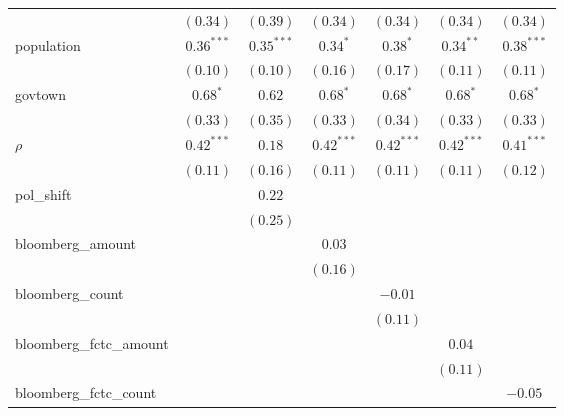 \begin{table}[!h]
\begin{center}
\begin{tabular}{l c c c c c c }
                        & $(0.34)$      & $(0.39)$      & $(0.34)$      & $(0.34)$      & $(0.34)$      & $(0.34)$      \\
population              & $0.36^{***}$  & $0.35^{***}$  & $0.34^{*}$    & $0.38^{*}$    & $0.34^{**}$   & $0.38^{***}$  \\
                        & $(0.10)$      & $(0.10)$      & $(0.16)$      & $(0.17)$      & $(0.11)$      & $(0.11)$      \\
govtown                 & $0.68^{*}$    & $0.62$        & $0.68^{*}$    & $0.68^{*}$    & $0.68^{*}$    & $0.68^{*}$    \\
                        & $(0.33)$      & $(0.35)$      & $(0.33)$      & $(0.34)$      & $(0.33)$      & $(0.33)$      \\
$\rho$                  & $0.42^{***}$  & $0.18$        & $0.42^{***}$  & $0.42^{***}$  & $0.42^{***}$  & $0.41^{***}$  \\
                        & $(0.11)$      & $(0.16)$      & $(0.11)$      & $(0.11)$      & $(0.11)$      & $(0.12)$      \\
pol\_shift              &               & $0.22$        &               &               &               &               \\
                        &               & $(0.25)$      &               &               &               &               \\
bloomberg\_amount       &               &               & $0.03$        &               &               &               \\
                        &               &               & $(0.16)$      &               &               &               \\
bloomberg\_count        &               &               &               & $-0.01$       &               &               \\
                        &               &               &               & $(0.11)$      &               &               \\
bloomberg\_fctc\_amount &               &               &               &               & $0.04$        &               \\
                        &               &               &               &               & $(0.11)$      &               \\
bloomberg\_fctc\_count  &               &               &               &               &               & $-0.05$       \\

\end{tabular}
\end{center}
\end{table}
